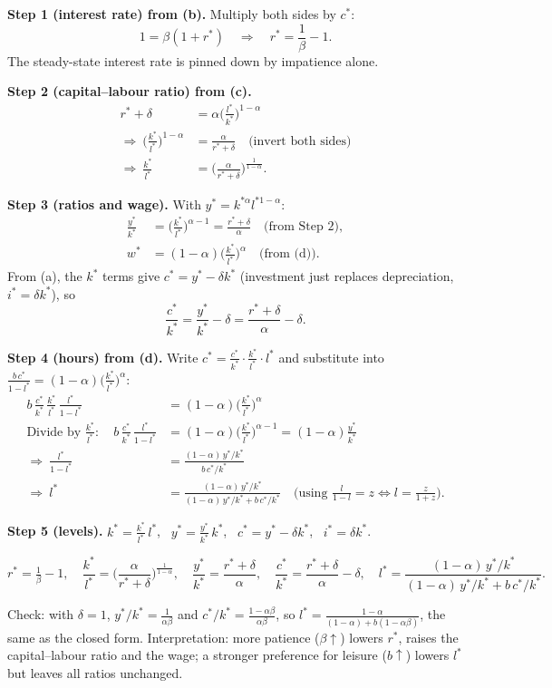 \textbf{Step 1 (interest rate) from (b).} Multiply both sides by $c^*$:
\[
1=\beta(1+r^*)\quad\Rightarrow\quad r^*=\frac1\beta-1 .
\]
The steady-state interest rate is pinned down by impatience alone.

\textbf{Step 2 (capital--labour ratio) from (c).}
\begin{align*}
r^*+\delta&=\alpha\Big(\frac{l^*}{k^*}\Big)^{1-\alpha}\\
\Rightarrow\ \Big(\frac{k^*}{l^*}\Big)^{1-\alpha}&=\frac{\alpha}{r^*+\delta}\quad\text{(invert both sides)}\\
\Rightarrow\ \frac{k^*}{l^*}&=\Big(\frac{\alpha}{r^*+\delta}\Big)^{\frac1{1-\alpha}}.
\end{align*}

\textbf{Step 3 (ratios and wage).} With $y^*=k^{*\alpha}l^{*1-\alpha}$:
\begin{align*}
\frac{y^*}{k^*}&=\Big(\frac{k^*}{l^*}\Big)^{\alpha-1}=\frac{r^*+\delta}{\alpha}\quad\text{(from Step 2)},\\
w^*&=(1-\alpha)\Big(\frac{k^*}{l^*}\Big)^{\alpha}\quad\text{(from (d))}.
\end{align*}
From (a), the $k^*$ terms give $c^*=y^*-\delta k^*$ (investment just replaces depreciation, $i^*=\delta k^*$), so
\[
\frac{c^*}{k^*}=\frac{y^*}{k^*}-\delta=\frac{r^*+\delta}{\alpha}-\delta .
\]

\textbf{Step 4 (hours) from (d).} Write $c^*=\frac{c^*}{k^*}\cdot\frac{k^*}{l^*}\cdot l^*$ and substitute into $\frac{b\,c^*}{1-l^*}=(1-\alpha)\big(\frac{k^*}{l^*}\big)^{\alpha}$:
\begin{align*}
b\,\frac{c^*}{k^*}\,\frac{k^*}{l^*}\,\frac{l^*}{1-l^*}&=(1-\alpha)\Big(\frac{k^*}{l^*}\Big)^{\alpha}\\
\text{Divide by }\tfrac{k^*}{l^*}:\quad b\,\frac{c^*}{k^*}\,\frac{l^*}{1-l^*}&=(1-\alpha)\Big(\frac{k^*}{l^*}\Big)^{\alpha-1}=(1-\alpha)\frac{y^*}{k^*}\\
\Rightarrow\ \frac{l^*}{1-l^*}&=\frac{(1-\alpha)\,y^*/k^*}{b\,c^*/k^*}\\
\Rightarrow\ l^*&=\frac{(1-\alpha)\,y^*/k^*}{(1-\alpha)\,y^*/k^*+b\,c^*/k^*}\quad\Big(\text{using }\tfrac{l}{1-l}=z\iff l=\tfrac{z}{1+z}\Big).
\end{align*}

\textbf{Step 5 (levels).} $k^*=\frac{k^*}{l^*}\,l^*$, \ $y^*=\frac{y^*}{k^*}\,k^*$, \ $c^*=y^*-\delta k^*$, \ $i^*=\delta k^*$.

\begin{keybox}[title=Steady state of the RBC model]
\[
r^*=\tfrac1\beta-1,\quad \frac{k^*}{l^*}=\Big(\frac{\alpha}{r^*+\delta}\Big)^{\frac1{1-\alpha}},\quad
\frac{y^*}{k^*}=\frac{r^*+\delta}{\alpha},\quad \frac{c^*}{k^*}=\frac{r^*+\delta}{\alpha}-\delta,\quad
l^*=\frac{(1-\alpha)\,y^*/k^*}{(1-\alpha)\,y^*/k^*+b\,c^*/k^*}.
\]
\end{keybox}
Check: with $\delta=1$, $y^*/k^*=\frac{1}{\alpha\beta}$ and $c^*/k^*=\frac{1-\alpha\beta}{\alpha\beta}$, so $l^*=\frac{1-\alpha}{(1-\alpha)+b(1-\alpha\beta)}$, the same as the closed form. Interpretation: more patience ($\beta\uparrow$) lowers $r^*$, raises the capital--labour ratio and the wage; a stronger preference for leisure ($b\uparrow$) lowers $l^*$ but leaves all ratios unchanged.

